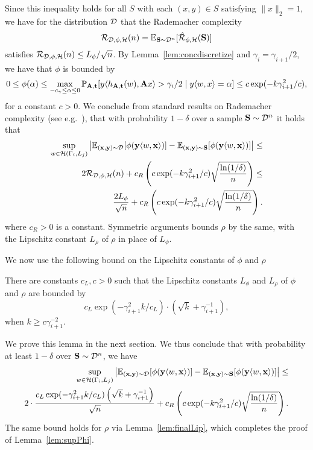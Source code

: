 Since this inequality holds for all $S$ with each $(x,y) \in S$ satisfying $\|x\|_2 = 1$, we have for the distribution $\mathcal{D}$ that the Rademacher complexity
\[
\mathcal{R}_{\mathcal{D},\phi,\mathcal{H}}(n) = \mathbb{E}_{\mathbf{S} \sim \mathcal{D}^n}[\hat{\mathcal{R}}_{\phi,\mathcal{H}}(\mathbf{S})]
\]
satisfies $\mathcal{R}_{\mathcal{D},\phi,\mathcal{H}}(n) \leq L_\phi/\sqrt{n}$. By Lemma~\ref{lem:concdiscretize} and $\gamma_i = \gamma_{i+1}/2$, we have that $\phi$ is bounded by 
\[
0 \leq \phi(\alpha) \leq \max_{-c_\gamma \leq \alpha \leq 0}\mathbb{P}_{\mathbf{A}, \mathbf{t}}[y \langle h_{\mathbf{A},\mathbf{t}}(w), \mathbf{A} x\rangle > \gamma_i/2 \mid y \langle w, x \rangle = \alpha] \leq c\exp(-k\gamma_{i+1}^2/c),
\]
for a constant $c>0$. We conclude from standard results on Rademacher complexity (see e.g.~\cite{rademacherbound}), that with probability $1-\delta$ over a sample $\mathbf{S} \sim \mathcal{D}^n$ it holds that
\begin{align*}
\sup_{w \in \mathcal{H}(\Gamma_i,L_j)} \left| \mathbb{E}_{(\mathbf{x},\mathbf{y}) \sim \mathcal{D}}[\phi(\mathbf{y} \langle w, \mathbf{x} \rangle)] -\mathbb{E}_{(\mathbf{x},\mathbf{y}) \sim \mathbf{S}}[\phi(\mathbf{y} \langle w, \mathbf{x} \rangle)]\right| \leq& \\
2 \mathcal{R}_{\mathcal{D},\phi,\mathcal{H}}(n) + c_R\left(c\exp(-k\gamma_{i+1}^2/c)\sqrt{\frac{\ln(1/\delta)}{n}} \right) \leq&\\
\frac{2 L_\phi}{\sqrt{n}} + c_R\left(c\exp(-k\gamma_{i+1}^2/c)\sqrt{\frac{\ln(1/\delta)}{n}} \right).
\end{align*}
where $c_R>0$ is a constant. Symmetric arguments bounds $\rho$ by the same, with the Lipschitz constant $L_\rho$ of $\rho$ in place of $L_\phi$.

We now use the following bound on the Lipschitz constants of $\phi$ and $\rho$
\begin{lemma}
\label{lem:finalLip}
There are constants $c_L, c>0$ such that the Lipschitz constants $L_\phi$ and $L_\rho$ of $\phi$ and $\rho$ are bounded by
\[
c_L \exp(-\gamma_{i+1}^2 k/c_L)\cdot \left(\sqrt{k} + \gamma^{-1}_{i+1}\right),
\]
when $k \geq c \gamma_{i+1}^{-2}$.
\end{lemma}
We prove this lemma in the next section. We thus conclude that with probability at least $1-\delta$ over $\mathbf{S} \sim \mathcal{D}^n$, we have
\begin{align*}
\sup_{w \in \mathcal{H}(\Gamma_i,L_j)} \left| \mathbb{E}_{(\mathbf{x},\mathbf{y}) \sim \mathcal{D}}[\phi(\mathbf{y} \langle w, \mathbf{x} \rangle)] -\mathbb{E}_{(\mathbf{x},\mathbf{y}) \sim \mathbf{S}}[\phi(\mathbf{y} \langle w, \mathbf{x} \rangle)]\right| \leq& \\
2 \cdot \frac{c_L \exp(-\gamma_{i+1}^2k/c_L)\left(\sqrt{k} +\gamma^{-1}_{i+1}\right)}{\sqrt{n}} + c_R \left(c \exp(-k \gamma_{i+1}^2/c) \sqrt{\frac{\ln(1/\delta)}{n}} \right).
\end{align*}
The same bound holds for $\rho$ via Lemma~\ref{lem:finalLip}, which completes the proof of Lemma~\ref{lem:supPhi}.